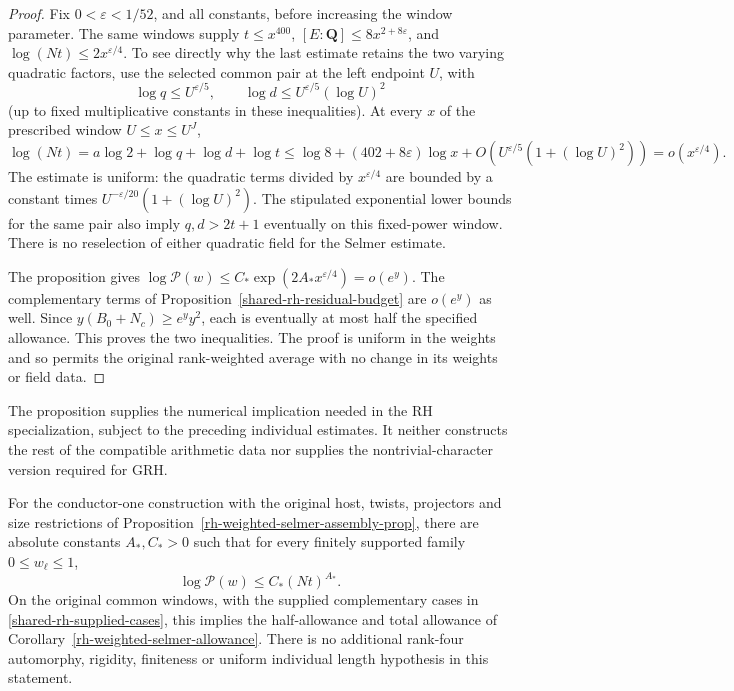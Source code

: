 \begin{proof}
Fix \(0<\varepsilon<1/52\), and all constants, before increasing
the window parameter. The same windows supply \(t\le x^{400}\),
\([E:\mathbf Q]\le8x^{2+8\varepsilon}\), and
\(\log(Nt)\le2x^{\varepsilon/4}\).
To see directly why the last estimate retains the two varying
quadratic factors, use the selected common pair at the left
endpoint \(U\), with
\[
 \log q\le U^{\varepsilon/5},\qquad
 \log d\le U^{\varepsilon/5}(\log U)^2
\]
(up to fixed multiplicative constants in these inequalities).
At every \(x\) of the prescribed window \(U\le x\le U^J\),
\[
 \log(Nt)=a\log2+\log q+\log d+\log t
 \le \log8+(402+8\varepsilon)\log x
       +O(U^{\varepsilon/5}(1+(\log U)^2))
 =o(x^{\varepsilon/4}).
\]
The estimate is uniform: the quadratic terms divided by
\(x^{\varepsilon/4}\) are bounded by a constant times
\(U^{-\varepsilon/20}(1+(\log U)^2)\).
The stipulated exponential lower bounds for the same pair
also imply \(q,d>2t+1\) eventually on this fixed-power window.
There is no reselection of either quadratic field for the
Selmer estimate.

The proposition gives \(\log\mathcal P(w)\le
 C_*\exp(2A_* x^{\varepsilon/4})=o(e^y)\).
The complementary terms of Proposition~\ref{shared-rh-residual-budget}
are \(o(e^y)\) as well. Since \(y(B_0+N_c)\ge e^y y^2\),
each is eventually at most half the specified allowance.
This proves the two inequalities. The proof is uniform in
the weights and so permits the original rank-weighted average
with no change in its weights or field data.
\end{proof}

The proposition supplies the numerical implication needed in
the RH specialization, subject to the preceding individual estimates.
It neither constructs the rest of the compatible arithmetic data
nor supplies the nontrivial-character version required for GRH.


\begin{theorem}\label{thm:rh-weighted-selmer-supplier}
For the conductor-one construction with the original host, twists,
projectors and size restrictions of
Proposition~\ref{rh-weighted-selmer-assembly-prop},
there are absolute constants \(A_*,C_*>0\) such that for every
finitely supported family \(0\le w_\ell\le1\),
\[
              \log\mathcal P(w)\le C_*(Nt)^{A_*}.
\]
On the original common windows, with the supplied complementary cases
in \eqref{shared-rh-supplied-cases}, this implies the half-allowance
and total allowance of Corollary~\ref{rh-weighted-selmer-allowance}.
There is no additional rank-four automorphy, rigidity, finiteness or
uniform individual length hypothesis in this statement.
\end{theorem}

